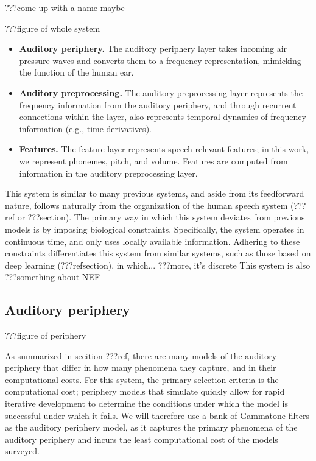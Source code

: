 ???come up with a name maybe

???figure of whole system

\begin{itemize}
\item \textbf{Auditory periphery.} The auditory periphery layer
  takes incoming air pressure waves and converts them
  to a frequency representation,
  mimicking the function of the human ear.
\item \textbf{Auditory preprocessing.} The auditory preprocessing layer
  represents the frequency information from the auditory periphery,
  and through recurrent connections within the layer,
  also represents temporal dynamics of frequency information
  (e.g., time derivatives).
\item \textbf{Features.} The feature layer
  represents speech-relevant features;
  in this work, we represent phonemes, pitch, and volume.
  Features are computed from information
  in the auditory preprocessing layer.
\end{itemize}

This system is similar to many previous systems,
and aside from its feedforward nature,
follows naturally from the organization
of the human speech system (???ref or ???section).
The primary way in which this system
deviates from previous models
is by imposing biological constraints.
Specifically, the system operates
in continuous time,
and only uses locally available information.
Adhering to these constraints differentiates
this system from similar systems,
such as those based on deep learning (???refsection),
in which... ???more, it's discrete
This system is also ???something about NEF

\subsection{Auditory periphery}

???figure of periphery

As summarized in secition ???ref,
there are many models of the auditory periphery
that differ in how many phenomena they capture,
and in their computational costs.
For this system,
the primary selection criteria is
the computational cost;
periphery models that simulate quickly
allow for rapid iterative development
to determine the conditions
under which the model is successful
under which it fails.
We will therefore use
a bank of Gammatone filters as the
auditory periphery model,
as it captures the primary phenomena
of the auditory periphery
and incurs the least computational cost
of the models surveyed.

